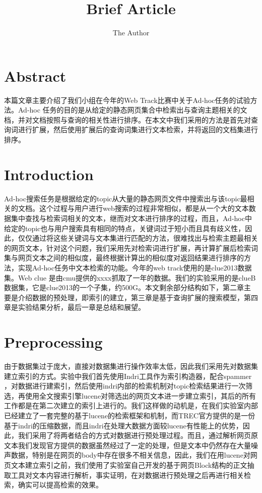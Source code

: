 \documentclass[11pt]{article} %
\title{Brief Article}
\author{The Author}
\begin{document}
\begin{CJK}{UTF8}{gkai}
\maketitle

\section{Abstract}
本篇文章主要介绍了我们小组在今年的Web Track比赛中关于Ad-hoc任务的试验方法。Ad-hoc  任务的目的是从给定的静态网页集合中检索出与查询主题相关的文档，并对文档按照与查询的相关性进行排序。在本文中我们采用的方法是首先对查询词进行扩展，然后使用扩展后的查询词集进行文本检索，并将返回的文档集进行排序。

\section{Introduction}

Ad-hoc搜索任务是根据给定的topic从大量的静态网页文件中搜索出与该topic最相关的文档。这个过程与用户进行web搜索的过程非常相似，都是从一个大的文本数据集中查找与检索词相关的文本，继而对文本进行排序的过程，而且，Ad-hoc中给定的topic也与用户搜索具有相同的特点，关键词过于短小而且具有歧义性，因此，仅仅通过将这些关键词与文本集进行匹配的方法，很难找出与检索主题最相关的网页文本，针对这个问题，我们采用先对检索词进行扩展，再计算扩展后检索词集与网页文本之间的相似度，最终根据计算出的相似度对返回结果进行排序的方法，实现Ad-hoc任务中文本检索的功能。今年的web track使用的是clue2013数据集。Web clue 是由cmu提供的xxxx抓取了一年的数据。我们的实验采用的是clueB数据集，它是clue2013的一个子集，约500G。本文剩余部分结构如下，第二章主要是介绍数据的预处理，即索引的建立，第三章是基于查询扩展的搜索模型，第四章是实验结果分析，最后一章是总结和展望。

\section{Preprocessing}
由于数据集过于庞大，直接对数据集进行操作效率太低，因此我们采用先对数据集建立索引的方式。实验中我们首先使用Indri工具作为索引构造器，配合spammer \cite{Kxxspammer}，对数据进行建索引，然后使用indri内部的检索机制对topic检索结果进行一次筛选，再使用全文搜索引擎lucene对筛选出的网页文本进一步建立索引，其后的所有工作都是在第二次建立的索引上进行的。我们这样做的动机是，在我们实验室内部已经建立了一套完整的基于lucene的检索框架和机制，而TREC官方提供的是一份基于indri的压缩数据，而且indri在处理大数据方面较lucene有性能上的优势，因此，我们采用了将两者结合的方式对数据进行预处理过程。而且，通过解析网页原文本我们发现官方提供的数据虽然经过了一定的处理，但是文本中仍然存在大量噪声数据，特别是在网页的body中存在很多不相关信息，因此，我们在用lucene对网页文本建立索引之前，我们使用了实验室自己开发的基于网页Block结构的正文抽取工具对文本内容进行解析，事实证明，在对数据进行预处理之后再进行相关检索，确实可以提高检索的效果。


\end{CJK}
\end{document}
